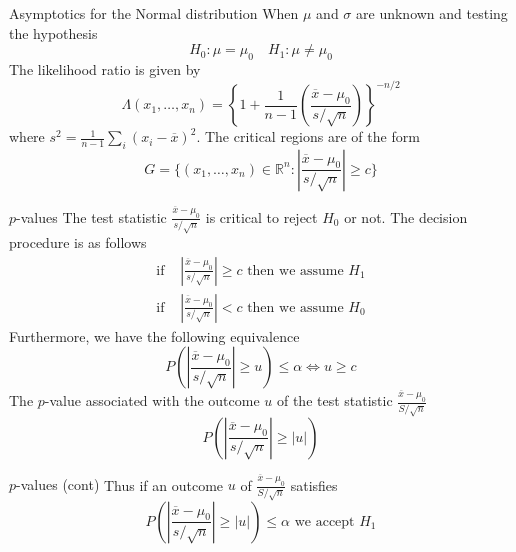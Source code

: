 \documentclass{beamer}
\begin{document}
\begin{frame}{Asymptotics for the Normal distribution}
	When $\mu$ and $\sigma$ are unknown and testing the hypothesis
	\begin{equation*}
		H_0 \colon \mu=\mu_0 \quad H_1 \colon \mu \ne \mu_0
	\end{equation*}
	The likelihood ratio is given by
	\begin{equation*}
		\Lambda(x_1,\ldots, x_n)= \left\{ 1+ \frac{1}{n-1}\left( \frac{\overline{x}-\mu_0}{s/\sqrt{n}}\right)\right\}^{-n/2}
	\end{equation*}
	where $s^2= \frac{1}{n-1}\sum_{i}(x_i-\overline{x})^2$. The critical regions are of the form
	\begin{equation*}
		G= \{ (x_1,\ldots, x_n)\in \mathbb{R}^n: \left|\frac{\overline{x}-\mu_0}{s/\sqrt{n}} \right|\ge c\}
	\end{equation*}
\end{frame}
\begin{frame}{$p$-values}
	The test statistic $\frac{\overline{x}-\mu_0}{s/\sqrt{n}}$ is critical to reject $H_0$ or not. The decision procedure is as follows
	\begin{equation*}
		\begin{split}
			\text{if }&\left| \frac{\overline{x}-\mu_0}{s/\sqrt{n}} \right| \ge c \text{ then we assume }H_1\\
			\text{if }&\left| \frac{\overline{x}-\mu_0}{s/\sqrt{n}} \right| <c \text{ then we assume }H_0
		\end{split}
	\end{equation*}
	Furthermore, we have the following equivalence
	\begin{equation*}
		P\left(	\left| \frac{\overline{x}-\mu_0}{s/\sqrt{n}} \right| \ge u \right)\le \alpha \iff u \ge c
	\end{equation*}
	The $p$-value associated with the outcome $u$ of the test statistic $\frac{\overline{x}-\mu_0}{S/\sqrt{n}}$ 
	\begin{equation*}
		P\left(	\left| \frac{\overline{x}-\mu_0}{s/\sqrt{n}} \right| \ge |u| \right)
	\end{equation*}
\end{frame}

\begin{frame}{$p$-values (cont)}
	Thus if an outcome $u$ of $\frac{\overline{x}-\mu_0}{S/\sqrt{n}}$  satisfies 
	\begin{equation*}
		P\left(	\left| \frac{\overline{x}-\mu_0}{s/\sqrt{n}} \right| \ge |u| \right) \le \alpha \text{ we accept }H_1
	\end{equation*}
	
\end{frame}
	
\end{document}
